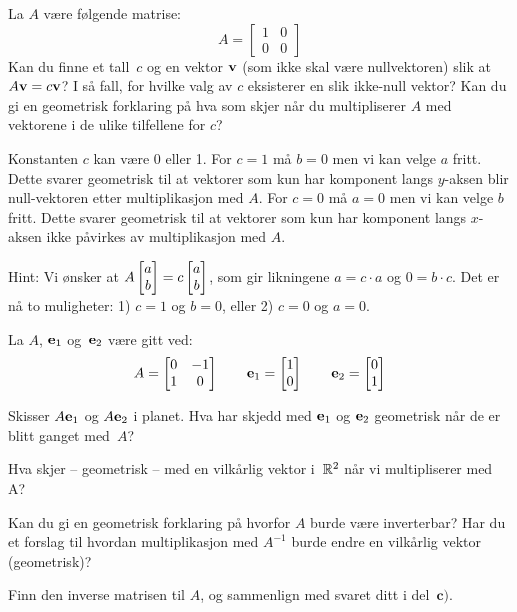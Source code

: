 \begin{oppgave}
La $A$ være følgende matrise:
\[
A=\begin{bmatrix}
1 & 0\\
0 & 0
\end{bmatrix}
\]
Kan du finne et tall~$c$ og en vektor $\mathbf{v}$ (som ikke skal være
nullvektoren) slik at $A\mathbf{v}=c\mathbf{v}$?  I så fall, for hvilke valg av
$c$ eksisterer en slik ikke-null vektor? Kan du gi en geometrisk
forklaring på hva som skjer når du multipliserer $A$ med vektorene i
de ulike tilfellene for $c$?
\end{oppgave}



\begin{losning}

Konstanten $c$ kan være 0 eller 1. For $c=1$ må $b=0$ men vi kan velge $a$ fritt. Dette svarer geometrisk til at vektorer som kun har komponent langs $y$-aksen blir null-vektoren etter multiplikasjon med $A$. For $c=0$ må $a=0$ men vi kan velge $b$ fritt. Dette svarer geometrisk til at vektorer som kun har komponent langs $x$-aksen ikke påvirkes av multiplikasjon med $A$.


Hint: Vi ønsker at $A\begin{bmatrix} a \\ b \end{bmatrix}=c\begin{bmatrix} a \\ b \end{bmatrix}$, som gir likningene $a=c\cdot a$ og $0=b\cdot c$. Det er nå to muligheter: 1) $c=1$ og $b=0$, eller 2) $c=0$ og $a=0$.



\end{losning}




\begin{oppgave}
La $A$, $\mathbf{e}_1$ og~$\mathbf{e}_2$ være gitt ved:
\[
A=\begin{bmatrix}
0 & -1\\
1 & 0
\end{bmatrix}
\qquad
\mathbf{e}_1 = \begin{bmatrix} 1 \\ 0 \end{bmatrix}
\qquad
\mathbf{e}_2 = \begin{bmatrix} 0 \\ 1 \end{bmatrix}
\]

\begin{punkt}
Skisser $A \mathbf{e}_1$ og $A \mathbf{e}_2$ i planet. Hva har skjedd med
$\mathbf{e}_1$ og $\mathbf{e}_2$ geometrisk når de er blitt ganget med~$A$?
\end{punkt}

\begin{punkt}
Hva skjer -- geometrisk -- med en vilkårlig vektor i~$\mathbb{R}^2$ når vi
multipliserer med A?
\end{punkt}

\begin{punkt}
Kan du gi en geometrisk forklaring på hvorfor $A$ burde være inverterbar? Har du et forslag til hvordan multiplikasjon med $A^{-1}$ burde endre en vilkårlig vektor (geometrisk)?
\end{punkt}

\begin{punkt}
Finn den inverse matrisen til $A$, og sammenlign med svaret ditt i
del~$\textbf{c)}$.
\end{punkt}

\end{oppgave}

